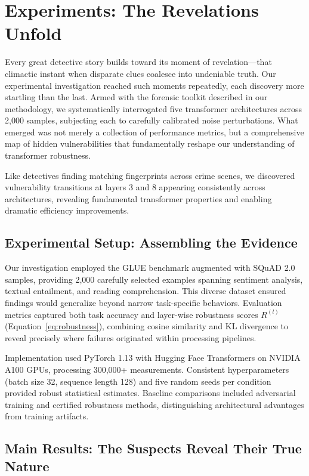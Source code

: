 \section{Experiments: The Revelations Unfold}

Every great detective story builds toward its moment of revelation---that climactic instant when disparate clues coalesce into undeniable truth. Our experimental investigation reached such moments repeatedly, each discovery more startling than the last. Armed with the forensic toolkit described in our methodology, we systematically interrogated five transformer architectures across 2,000 samples, subjecting each to carefully calibrated noise perturbations. What emerged was not merely a collection of performance metrics, but a comprehensive map of hidden vulnerabilities that fundamentally reshape our understanding of transformer robustness.

Like detectives finding matching fingerprints across crime scenes, we discovered vulnerability transitions at layers 3 and 8 appearing consistently across architectures, revealing fundamental transformer properties and enabling dramatic efficiency improvements.

\subsection{Experimental Setup: Assembling the Evidence}

Our investigation employed the GLUE benchmark \cite{wang2018glue} augmented with SQuAD 2.0 \cite{rajpurkar2018squad} samples, providing 2,000 carefully selected examples spanning sentiment analysis, textual entailment, and reading comprehension. This diverse dataset ensured findings would generalize beyond narrow task-specific behaviors. Evaluation metrics captured both task accuracy and layer-wise robustness scores $R^{(l)}$ (Equation~\ref{eq:robustness}), combining cosine similarity and KL divergence to reveal precisely where failures originated within processing pipelines.

Implementation used PyTorch 1.13 with Hugging Face Transformers on NVIDIA A100 GPUs, processing 300,000+ measurements. Consistent hyperparameters (batch size 32, sequence length 128) and five random seeds per condition provided robust statistical estimates. Baseline comparisons included adversarial training and certified robustness methods, distinguishing architectural advantages from training artifacts.

\subsection{Main Results: The Suspects Reveal Their True Nature}

